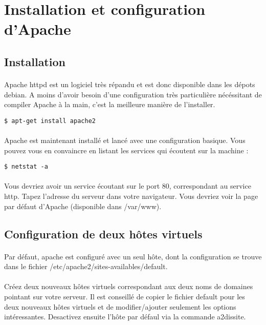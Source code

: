 \documentclass[12pt,a4paper]{article}
\begin{document}
\section{Installation et configuration d'Apache}
\subsection{Installation}

\paragraph{}
Apache httpd est un logiciel très répandu et est donc disponible dans les dépots debian. A moins d'avoir besoin d'une configuration très particulière nécéssitant de compiler Apache à la main, c'est la meilleure manière de l'installer.

\begin{lstlisting}
$ apt-get install apache2
\end{lstlisting}

\paragraph{}
Apache est maintenant installé et lancé avec une configuration basique. Vous pouvez vous en convaincre en listant les services qui écoutent sur la machine : 

\begin{lstlisting}
$ netstat -a
\end{lstlisting}

\paragraph{}
Vous devriez avoir un service écoutant sur le port 80, correspondant au service http. Tapez l'adresse du serveur dans votre navigateur. Vous devriez voir la page par défaut d'Apache (disponible dans /var/www).

\subsection{Configuration de deux hôtes virtuels}
\paragraph{}
Par défaut, apache est configuré avec un seul hôte, dont la configuration se trouve dans le fichier /etc/apache2/sites-availables/default.

\paragraph{}
Créez deux nouveaux hôtes virtuels correspondant aux deux noms de domaines pointant sur votre serveur. Il est conseillé de copier le fichier default pour les deux nouveaux hôtes virtuels et de modifier/ajouter seulement les options intéressantes. Desactivez ensuite l'hôte par défaul via la commande a2dissite.
\end{document}
